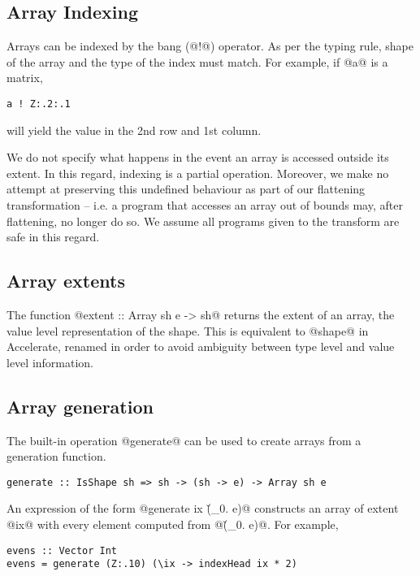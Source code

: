 
\subsection{Array Indexing}

Arrays can be indexed by the bang (@!@) operator. As per the typing rule, shape of the array and the type of the index must match. For example, if @a@ is a matrix,
%
\begin{lstlisting}
a ! Z:.2:.1
\end{lstlisting}
%
will yield the value in the 2nd row and 1st column.

We do not specify what happens in the event an array is accessed outside its extent. In this regard, indexing is a partial operation. Moreover, we make no attempt at preserving this undefined behaviour as part of our flattening transformation -- i.e. a program that accesses an array out of bounds may, after flattening, no longer do so. We assume all programs given to the transform are safe in this regard.

\subsection{Array extents}
The function @extent :: Array sh e -> sh@ returns the extent of an array, the value level representation of the shape. This is equivalent to @shape@ in Accelerate, renamed in order to avoid ambiguity between type level and value level information.

\subsection{Array generation}
The built-in operation @generate@ can be used to create arrays from a generation function.
%
\begin{lstlisting}
generate :: IsShape sh => sh -> (sh -> e) -> Array sh e
\end{lstlisting}
%
An expression of the form @generate ix (\v_0. e)@ constructs an array of extent @ix@ with every element computed from @(\v_0. e)@. For example,
%
\begin{lstlisting}
evens :: Vector Int
evens = generate (Z:.10) (\ix -> indexHead ix * 2)
\end{lstlisting}

